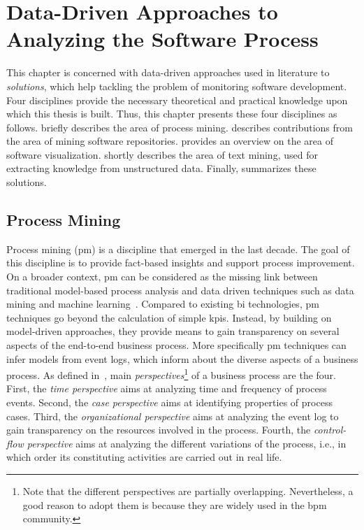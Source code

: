 \chapter{Data-Driven Approaches to Analyzing the Software Process }
\label{chap:ch3-solution-background}

This chapter is concerned with data-driven approaches used in literature to \emph{solutions}, which help tackling the problem of monitoring software development. Four disciplines provide the necessary theoretical and practical knowledge upon which this thesis is built. Thus, this chapter presents these four disciplines as follows.  briefly describes the area of process mining.  describes contributions from the area of mining software repositories.  provides an overview on the area of software visualization.  shortly describes the area of text mining, used for extracting knowledge from unstructured data. Finally,  summarizes these solutions. 


\section{Process Mining}
\label{sec:process-mining}


Process mining (\gls{pm}) is a discipline that emerged in the last decade. The goal of this discipline is to provide fact-based insights and support process improvement. On a broader context, \gls{pm} can be considered as the missing link between traditional model-based process analysis and data driven techniques such as data mining and machine learning~\citep{VanderAalst2016b}. Compared to existing \gls{bi} technologies, \gls{pm} techniques go beyond the calculation of simple \glspl{kpi}. Instead, by building on model-driven approaches, they provide means to gain transparency on several aspects of the end-to-end business process. More specifically \gls{pm} techniques can infer models from event logs, which inform about the diverse aspects of a business process.
As defined in~\citep{VanderAalst2016b}, main \emph{perspectives}\footnote{Note that the different perspectives are partially overlapping. Nevertheless, a good reason to adopt them is because they are widely used in the \gls{bpm} community.} of a business process are the four. First, the \emph{time perspective} aims at analyzing time and frequency of process events. Second, the \emph{case perspective} aims at identifying properties of process cases. Third, the \emph{organizational perspective} aims at analyzing the event log to gain transparency on the resources involved in the process. Fourth, the \emph{control-flow perspective} aims at analyzing the different variations of the process, i.e., in which order its constituting activities are carried out in real life. 

